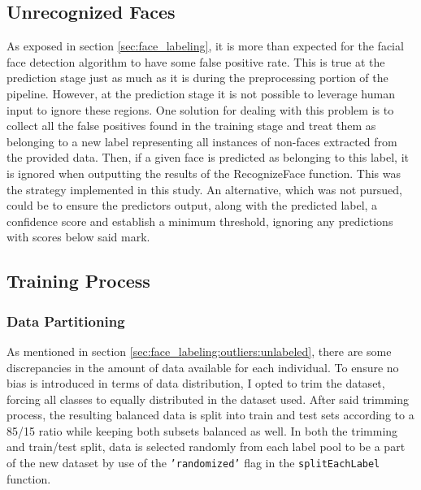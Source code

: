\documentclass[11pt]{article}
\begin{document}
    \subsection{Unrecognized Faces}\label{sec:non-faces}
        As exposed in section \ref{sec:face_labeling}, it is more than expected for the facial face detection algorithm to have some false positive rate. This is true at the prediction stage just as much as it is during the preprocessing portion of the pipeline. However, at the prediction stage it is not possible to leverage human input to ignore these regions. One solution for dealing with this problem is to collect all the false positives found in the training stage and treat them as belonging to a new label representing all instances of non-faces extracted from the provided data. Then, if a given face is predicted as belonging to this label, it is ignored when outputting the results of the RecognizeFace function. This was the strategy implemented in this study. An alternative, which was not pursued, could be to ensure the predictors output, along with the predicted label, a confidence score and establish a minimum threshold, ignoring any predictions with scores below said mark.

    \subsection{Training Process}
        \subsubsection{Data Partitioning}
            As mentioned in section \ref{sec:face_labeling:outliers:unlabeled}, there are some discrepancies in the amount of data available for each individual. To ensure no bias is introduced in terms of data distribution, I opted to trim the dataset, forcing all classes to equally distributed in the dataset used. After said trimming process, the resulting balanced data is split into train and test sets according to a 85/15 ratio while keeping both subsets balanced as well. In both the trimming and train/test split, data is selected randomly from each label pool to be a part of the new dataset by use of the \texttt{'randomized'} flag in the \texttt{splitEachLabel} function.
\end{document}
